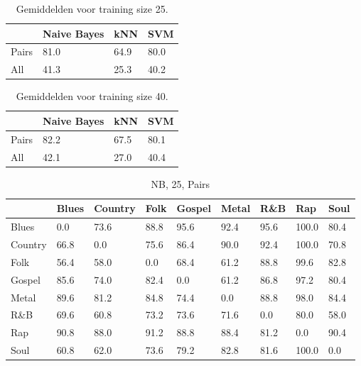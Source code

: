 \documentclass[a4paper,oneside]{article}
\begin{document}
\begin{table}[H]\centering
\caption{Gemiddelden voor training size 25.}
\begin{tabu}{l|l|l|l}
& Naive Bayes & kNN & SVM \\ \hline
Pairs & 81.0 & 64.9 & 80.0 \\
All & 41.3 & 25.3 & 40.2 \\
\end{tabu}
\end{table}

\begin{table}[H]\centering
\caption{Gemiddelden voor training size 40.}
\begin{tabu}{l|l|l|l}
& Naive Bayes & kNN & SVM \\ \hline
Pairs & 82.2 & 67.5 & 80.1 \\
All & 42.1 & 27.0 & 40.4 \\
\end{tabu}
\end{table}

\begin{table}[H]\centering
\caption{NB, 25, Pairs}
\begin{tabu}{l|*{8}{l}}
 & Blues & Country & Folk & Gospel & Metal & R\&B & Rap & Soul \\ \hline
Blues & 0.0 & 73.6 & 88.8 & 95.6 & 92.4 & 95.6 & 100.0 & 80.4 \\
Country & 66.8 & 0.0 & 75.6 & 86.4 & 90.0 & 92.4 & 100.0 & 70.8 \\
Folk & 56.4 & 58.0 & 0.0 & 68.4 & 61.2 & 88.8 & 99.6 & 82.8 \\
Gospel & 85.6 & 74.0 & 82.4 & 0.0 & 61.2 & 86.8 & 97.2 & 80.4 \\
Metal & 89.6 & 81.2 & 84.8 & 74.4 & 0.0 & 88.8 & 98.0 & 84.4 \\
R\&B & 69.6 & 60.8 & 73.2 & 73.6 & 71.6 & 0.0 & 80.0 & 58.0 \\
Rap & 90.8 & 88.0 & 91.2 & 88.8 & 88.4 & 81.2 & 0.0 & 90.4 \\
Soul & 60.8 & 62.0 & 73.6 & 79.2 & 82.8 & 81.6 & 100.0 & 0.0 \\
\end{tabu}
\end{table}
\end{document}
